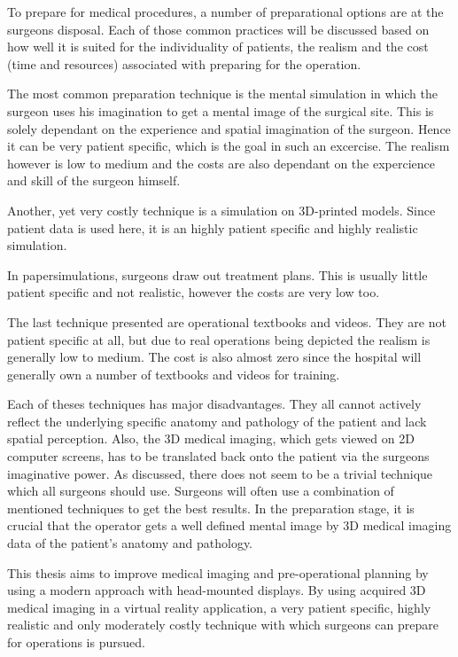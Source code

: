 To prepare for medical procedures, a number of preparational options are at the surgeons disposal.
Each of those common practices will be discussed based on how well it is suited for the individuality of patients, the realism and the cost (time and resources) associated with preparing for the operation.

The most common preparation technique is the mental simulation in which the surgeon uses his imagination to get a mental image of the surgical site.
This is solely dependant on the experience and spatial imagination of the surgeon. 
Hence it can be very patient specific, which is the goal in such an excercise.
The realism however is low to medium and the costs are also dependant on the expercience and skill of the surgeon himself.

Another, yet very costly technique is a simulation on 3D-printed models.
Since patient data is used here, it is an highly patient specific and highly realistic simulation.

In papersimulations, surgeons draw out treatment plans.
This is usually little patient specific and not realistic, however the costs are very low too.

The last technique presented are operational textbooks and videos.
They are not patient specific at all, but due to real operations being depicted the realism is generally low to medium.
The cost is also almost zero since the hospital will generally own a number of textbooks and videos for training.

Each of theses techniques has major disadvantages.
They all cannot actively reflect the underlying specific anatomy and pathology of the patient and lack spatial perception.
Also, the 3D medical imaging, which gets viewed on 2D computer screens, has to be translated back onto the patient via the surgeons imaginative power. 
As discussed, there does not seem to be a trivial technique which all surgeons should use.
Surgeons will often use a combination of mentioned techniques to get the best results.
In the preparation stage, it is crucial that the operator gets a well defined mental image by 3D medical imaging data of the patient's anatomy and pathology.

This thesis aims to improve medical imaging and pre-operational planning by using a modern approach with head-mounted displays.
By using acquired 3D medical imaging in a virtual reality application, a very patient specific, highly realistic and only moderately costly technique with which surgeons can prepare for operations is pursued.

